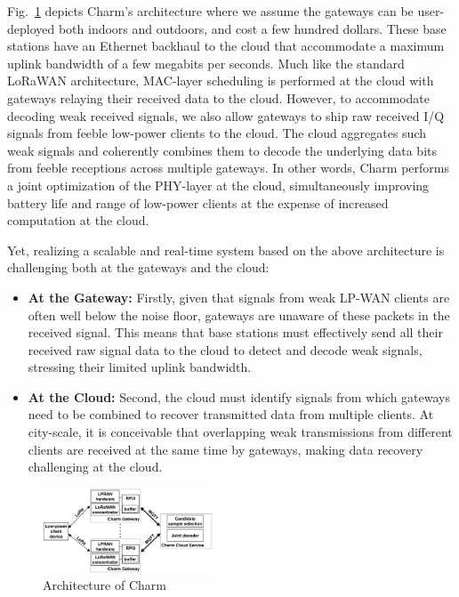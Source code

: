 Fig.~\ref{fig:architecture} depicts Charm's architecture where we assume the
gateways can be user-deployed  both indoors and outdoors, and cost a few
hundred dollars. These base stations have an Ethernet backhaul to the cloud
that accommodate a maximum uplink bandwidth of a few megabits per seconds.
Much like the standard LoRaWAN architecture, MAC-layer scheduling is performed
at the cloud with gateways relaying their received data to the cloud. However,
to accommodate decoding weak received signals, we also allow gateways to ship
raw received I/Q signals from feeble low-power clients to the cloud. The cloud
aggregates such weak signals and coherently combines them to decode the
underlying data bits from feeble receptions across multiple gateways. In other
words, Charm performs a joint optimization of the  PHY-layer at the cloud,
simultaneously improving battery life and range of low-power clients at the
expense of increased computation at the cloud.

Yet, realizing a scalable and real-time system based on the above architecture is challenging both at the gateways and the cloud: 
\begin{itemize}
\item {\bf At the Gateway: } Firstly, given that signals from weak LP-WAN
clients are often well below the noise floor, gateways are unaware of these
packets in the received signal. This means that base stations must effectively
send all their received raw signal data to the cloud to detect and decode weak
signals, stressing their limited uplink bandwidth.
\item {\bf At the Cloud: } Second, the cloud must identify signals from which gateways need to be combined to recover transmitted data from multiple clients. At city-scale, it is  conceivable that overlapping weak transmissions from different clients are received at the same time by gateways, making data recovery challenging at the cloud.
\end{itemize}


\begin{figure}[!htb]
    \centering
    \includegraphics[width=0.45\textwidth]{figures/charm-architecture_cropped.pdf}
    \caption{Architecture of Charm}
    \label{fig:architecture}
    \compactimg
\end{figure}


